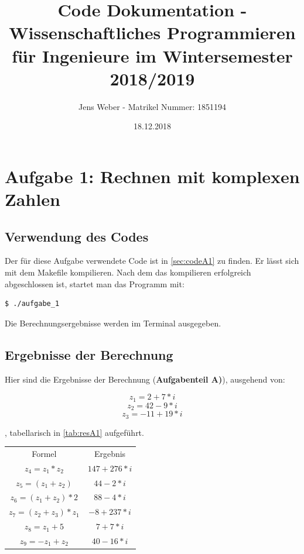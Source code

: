 \documentclass{report}
\title{Code Dokumentation - Wissenschaftliches Programmieren für Ingenieure im Wintersemester 2018/2019}
\author{Jens Weber - Matrikel Nummer: 1851194}
\date{18.12.2018}
\begin{document}
\maketitle{}
\clearpage{}


\tableofcontents{}
\clearpage{}

\chapter{Aufgabe 1: Rechnen mit komplexen Zahlen}

\section{Verwendung des Codes}\label{sec:verwendungA1}

Der für diese Aufgabe verwendete Code ist in \ref{sec:codeA1} zu finden. Er lässt sich mit dem Makefile kompilieren.
Nach dem das kompilieren erfolgreich abgeschlossen ist, startet man das Programm mit:
\begin{lstlisting}[language=bash]
  $ ./aufgabe_1
\end{lstlisting}
Die Berechnungsergebnisse werden im Terminal ausgegeben.



\section{Ergebnisse der Berechnung}\label{sec:ergebnisseA1}
Hier sind die Ergebnisse der Berechnung (\textbf{Aufgabenteil A)}), ausgehend von:

\begin{equation}\label{eq:gegZ1}
  z_1 = 2 + 7*i
\end{equation}
\begin{equation}\label{eq:gegZ2}
  z_2 = 42 - 9*i
\end{equation}
\begin{equation}\label{eq:gegZ3}
  z_3 = -11 + 19*i
\end{equation}


, tabellarisch in \ref{tab:resA1} aufgeführt.
\bigskip %

\begin{center}
\begin{tabular}{c|c}\label{tab:resA1}
Formel & Ergebnis \\
\cline{1-2}
$z_4 = z_1 * z_2$ & $147 + 276*i$ \\
\cline{1-2}
$z_5 = (z_1 + z_2)$ & $44 - 2*i$ \\
\cline{1-2}
$z_6 = (z_1 + z_2)*2$ & $88 - 4*i$  \\
\cline{1-2}
$z_7 = (z_2 + z_3)*z_1$ & $-8 + 237*i$ \\
\cline{1-2}
$z_8 = z_1 + 5$ & $7 + 7*i$ \\
\cline{1-2}
$z_9 = -z_1 + z_2$ & $40 - 16*i$ \\
\cline{1-2}
\end{tabular}
\label{table:resA1}
\end{center}
\end{document}
